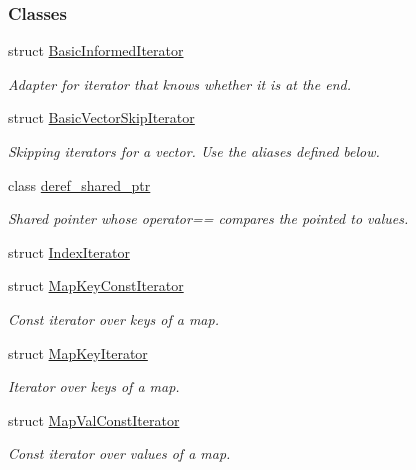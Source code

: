 \subsubsection*{Classes}
\begin{DoxyCompactItemize}
\item 
struct \hyperlink{structslb_1_1core_1_1util_1_1BasicInformedIterator}{Basic\+Informed\+Iterator}
\begin{DoxyCompactList}\small\item\em Adapter for iterator that knows whether it is at the end. \end{DoxyCompactList}\item 
struct \hyperlink{structslb_1_1core_1_1util_1_1BasicVectorSkipIterator}{Basic\+Vector\+Skip\+Iterator}
\begin{DoxyCompactList}\small\item\em Skipping iterators for a vector. Use the aliases defined below. \end{DoxyCompactList}\item 
class \hyperlink{classslb_1_1core_1_1util_1_1deref__shared__ptr}{deref\+\_\+shared\+\_\+ptr}
\begin{DoxyCompactList}\small\item\em Shared pointer whose {\ttfamily operator==} compares the pointed to values. \end{DoxyCompactList}\item 
struct \hyperlink{structslb_1_1core_1_1util_1_1IndexIterator}{Index\+Iterator}
\item 
struct \hyperlink{structslb_1_1core_1_1util_1_1MapKeyConstIterator}{Map\+Key\+Const\+Iterator}
\begin{DoxyCompactList}\small\item\em Const iterator over keys of a map. \end{DoxyCompactList}\item 
struct \hyperlink{structslb_1_1core_1_1util_1_1MapKeyIterator}{Map\+Key\+Iterator}
\begin{DoxyCompactList}\small\item\em Iterator over keys of a map. \end{DoxyCompactList}\item 
struct \hyperlink{structslb_1_1core_1_1util_1_1MapValConstIterator}{Map\+Val\+Const\+Iterator}
\begin{DoxyCompactList}\small\item\em Const iterator over values of a map. \end{DoxyCompactList}\item 

\end{DoxyCompactItemize}
